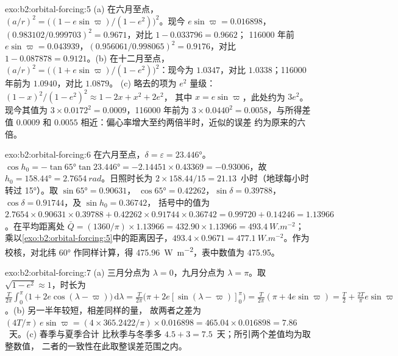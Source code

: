 \begin{solution}{exo:b2:orbital-forcing:5}
(a) 在六月至点，$(a/r)^2 = \bigl((1 - e\sin\varpi)/(1 - e^2)\bigr)^2$。现今 $e\sin\varpi
= 0.016898$，$(0.983102/0.999703)^2 = 0.9671$，对比 $1 - 0.033796 = 0.9662$；
\num{116000} 年前 $e\sin\varpi = 0.043939$，$(0.956061/0.998065)^2 = 0.9176$，对比 $1 -
0.087878 = 0.9121$。(b) 在十二月至点，$(a/r)^2 = \bigl((1 + e\sin\varpi)/(1 -
e^2)\bigr)^2$：现今为 $1.0347$，对比 $1.0338$；\num{116000} 年前为 $1.0940$，对比 $1.0879$。
(c) 略去的项为 $e^2$ 量级：$(1 - x)^2/(1 - e^2)^2 \approx 1 - 2x + x^2 + 2e^2$，
其中 $x = e\sin\varpi$，此处约为 $3e^2$。现今其值为 $3 \times 0.0172^2 = 0.0009$，\num{116000} 年前为 $3
\times 0.0440^2 = 0.0058$，与所得差值 $0.0009$ 和
$0.0055$ 相近：偏心率增大至约两倍半时，近似的误差
约为原来的六倍。
\end{solution}

\begin{solution}{exo:b2:orbital-forcing:6}
在六月至点，$\delta = \varepsilon = \ang{23.446}$。$\cos h_0 = -\tan\ang{65}\tan\ang{23.446}
= -2.14451 \times 0.43369 = -0.93006$，故 $h_0 = \ang{158.44} = \qty{2.7654}{rad}$。日照时长为
$2 \times 158.44/15 = 21.13$~小时（地球每小时转过 \ang{15}）。取 $\sin\ang{65} = 0.90631$，
$\cos\ang{65} = 0.42262$，$\sin\delta = 0.39788$，$\cos\delta = 0.91744$，及 $\sin h_0 = 0.36742$，
括号中的值为 $2.7654 \times 0.90631 \times 0.39788 + 0.42262 \times 0.91744 \times 0.36742 = 0.99720
+ 0.14246 = 1.13966$。在平均距离处 $\bar Q = (1360/\pi) \times 1.13966 = 432.90 \times 1.13966
= \qty{493.4}{W.m^{-2}}$；乘以\cref{exo:b2:orbital-forcing:5}中的距离因子，$493.4 \times
0.9671 = \qty{477.1}{W.m^{-2}}$。作为校核，对北纬 \ang{60} 作同样计算，得 \qty{475.96}{W.m^{-2}}，表中数值为 \num{475.95}。
\end{solution}

\begin{solution}{exo:b2:orbital-forcing:7}
(a) 三月分点为 $\lambda = 0$，九月分点为 $\lambda = \pi$。取 $\sqrt{1 - e^2}
\approx 1$，时长为 $\frac{T}{2\pi}\int_0^{\pi}\bigl(1 + 2e\cos(\lambda -
\varpi)\bigr)\,\mathrm d\lambda = \frac{T}{2\pi}\bigl(\pi + 2e[\sin(\lambda - \varpi)]_0^{\pi}\bigr)
= \frac{T}{2\pi}(\pi + 4e\sin\varpi) = \frac T2 + \frac{2T}{\pi}e\sin\varpi$。(b) 另一半年较短，相差同样的量，
故两者之差为 $(4T/\pi)\,e\sin\varpi = (4 \times
365.2422/\pi) \times 0.016898 = 465.04 \times 0.016898 = 7.86$~天。(c) 春季与夏季合计
比秋季与冬季多 $4.5 + 3 = 7.5$~天；所引两个差值均为取整数值，
二者的一致性在此取整误差范围之内。
\end{solution}

